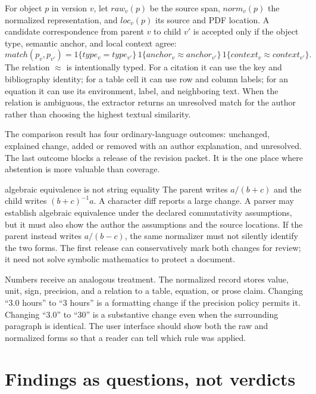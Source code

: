 For object $p$ in version $v$, let $raw_v(p)$ be the source span, $norm_v(p)$
the normalized representation, and $loc_v(p)$ its source and PDF location. A
candidate correspondence from parent $v$ to child $v'$ is accepted only if
the object type, semantic anchor, and local context agree:
\begin{equation}
  match(p_v,p_{v'}) =
  1\{type_v=type_{v'}\}\,1\{anchor_v\approx anchor_{v'}\}\,
  1\{context_v\approx context_{v'}\}.
  \label{eq:architecture-match}
\end{equation}
The relation $\approx$ is intentionally typed. For a citation it can use the
key and bibliography identity; for a table cell it can use row and column
labels; for an equation it can use its environment, label, and neighboring
text. When the relation is ambiguous, the extractor returns an unresolved
match for the author rather than choosing the highest textual similarity.

The comparison result has four ordinary-language outcomes: unchanged,
explained change, added or removed with an author explanation, and unresolved.
The last outcome blocks a release of the revision packet. It is the one place
where abstention is more valuable than coverage.

\begin{cardexample}{algebraic equivalence is not string equality}
The parent writes $a/(b+c)$ and the child writes $(b+c)^{-1}a$. A character
diff reports a large change. A parser may establish algebraic equivalence under
the declared commutativity assumptions, but it must also show the author the
assumptions and the source locations. If the parent instead writes
$a/(b-c)$, the same normalizer must not silently identify the two forms. The
first release can conservatively mark both changes for review; it need not
solve symbolic mathematics to protect a document.
\end{cardexample}

Numbers receive an analogous treatment. The normalized record stores value,
unit, sign, precision, and a relation to a table, equation, or prose claim.
Changing ``3.0 hours'' to ``3 hours'' is a formatting change if the precision
policy permits it. Changing ``3.0'' to ``30'' is a substantive change even when
the surrounding paragraph is identical. The user interface should show both
the raw and normalized forms so that a reader can tell which rule was applied.

\section{Findings as questions, not verdicts}
\label{sec:architecture-findings}

